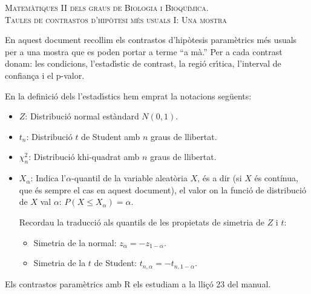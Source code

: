 \documentclass{article}
\renewcommand{\leq}{\leqslant}
\begin{document}

\renewcommand{\thecas}{\Roman{cas}}
\newcommand{\posacas}{\addtocounter{cas}{1}{\bf \thecas}}

\begin{center}
\textsc{Matemàtiques II dels graus de Biologia i Bioquímica.\\[0.5ex]  Taules de contrastos d'hip\`otesi m\'es usuals I: Una mostra}
\end{center}
\vspace*{2cm}

\noindent En aquest document recollim els contrastos d'hip\`otesis param\`etrics m\'es usuals per a una mostra  que es poden portar a terme ``a mà.'' Per a cada contrast donam: les condicions, l'estad\'{\i}stic
de contrast, la regi\'o cr\'{\i}tica, 
l'interval de confian\c ca i el p-valor.

En la definició dels l'estad\'{\i}stics hem emprat la notacions seg\"uents:
\begin{itemize}
\item  $Z$: {Distribuci\'o normal estàndard $N(0,1)$.} 
\item $t_n$: {Distribuci\'o
$t$ de Student amb $n$ graus de llibertat.} 
\item $\chi_n^2$: {Distribuci\'o
khi-quadrat amb $n$ graus de llibertat.} 
\item $X_\alpha$: Indica l'$\alpha$-quantil de la variable aleat\`oria $X$, és a dir (si $X$ és contínua, que és sempre el cas en aquest document), el valor on la
funci\'o de distribuci\'o de $X$ val $\alpha$: $P(X\leq X_\alpha
)=\alpha$. 

Recordau la traducció als quantils de les propietats de simetria de $Z$ i $t$:
\begin{itemize}
\item Simetria de la normal: $z_\alpha = -z_{1-\alpha}.$
\item Simetria de la $t$ de Student: $t_{n,\alpha} = -t_{n,1-\alpha}.$
\end{itemize}
\end{itemize}
Els contrastos paramètrics amb R els estudiam a la lliçó 23 del manual. 
\end{document}
